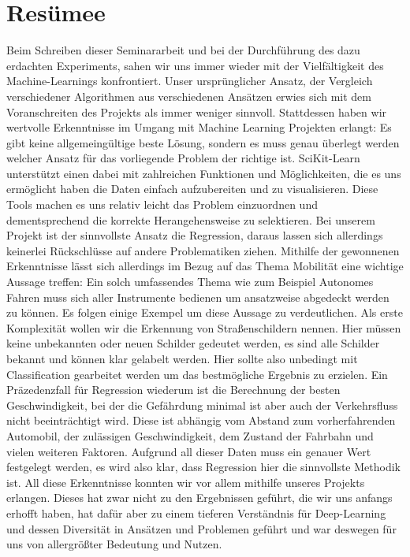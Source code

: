 \chapter{Resümee}
\label{resümee}
Beim Schreiben dieser Seminararbeit und bei der Durchführung des dazu erdachten Experiments, sahen wir uns immer wieder mit der Vielfältigkeit des Machine-Learnings konfrontiert. 
Unser ursprünglicher Ansatz, der Vergleich verschiedener Algorithmen aus verschiedenen Ansätzen erwies sich mit dem Voranschreiten des Projekts als immer weniger sinnvoll.
Stattdessen haben wir wertvolle Erkenntnisse im Umgang mit Machine Learning Projekten erlangt:
Es gibt keine allgemeingültige beste Lösung, sondern es muss genau überlegt werden welcher Ansatz für das vorliegende Problem der richtige ist. SciKit-Learn unterstützt einen dabei mit zahlreichen Funktionen und Möglichkeiten, die es uns ermöglicht haben die Daten einfach aufzubereiten und zu visualisieren. Diese Tools machen es uns relativ leicht das Problem einzuordnen und dementsprechend die korrekte Herangehensweise zu selektieren.
Bei unserem Projekt ist der sinnvollste Ansatz die Regression, daraus lassen sich allerdings keinerlei Rückschlüsse auf andere Problematiken ziehen.
Mithilfe der gewonnenen Erkenntnisse lässt sich allerdings im Bezug auf das Thema Mobilität eine wichtige Aussage treffen: 
Ein solch umfassendes Thema wie zum Beispiel Autonomes Fahren muss sich aller Instrumente bedienen um ansatzweise abgedeckt werden zu können. Es folgen einige Exempel um diese Aussage zu verdeutlichen.
Als erste Komplexität wollen wir die Erkennung von Straßenschildern nennen. Hier müssen keine unbekannten oder neuen Schilder gedeutet werden, es sind alle Schilder bekannt und können klar gelabelt werden. Hier sollte also unbedingt mit Classification gearbeitet werden um das bestmögliche Ergebnis zu erzielen.
Ein Präzedenzfall für Regression wiederum ist die Berechnung der besten Geschwindigkeit, bei der die Gefährdung minimal ist aber auch der Verkehrsfluss nicht beeinträchtigt wird. Diese ist abhängig vom Abstand zum vorherfahrenden Automobil, der zulässigen Geschwindigkeit, dem Zustand der Fahrbahn und vielen weiteren Faktoren. Aufgrund all dieser Daten muss ein genauer Wert festgelegt werden, es wird also klar, dass Regression hier die sinnvollste Methodik ist. 
All diese Erkenntnisse konnten wir vor allem mithilfe unseres Projekts erlangen. Dieses hat zwar nicht zu den Ergebnissen geführt, die wir uns anfangs erhofft haben, hat dafür aber zu einem tieferen Verständnis für Deep-Learning und dessen Diversität in Ansätzen und Problemen geführt und war deswegen für uns von allergrößter Bedeutung und Nutzen.






































